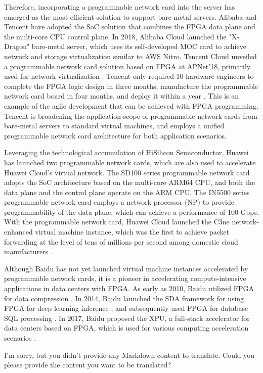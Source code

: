 Therefore, incorporating a programmable network card into the server has emerged as the most efficient solution to support bare-metal servers. Alibaba and Tencent have adopted the SoC solution that combines the FPGA data plane and the multi-core CPU control plane. In 2018, Alibaba Cloud launched the "X-Dragon" bare-metal server, which uses its self-developed MOC card \cite{alicloud-smartnic,alicloud-xdragon} to achieve network and storage virtualization similar to AWS Nitro. Tencent Cloud unveiled a programmable network card solution based on FPGA at APNet’18, primarily used for network virtualization \cite{tencent-smartnic}. Tencent only required 10 hardware engineers to complete the FPGA logic design in three months, manufacture the programmable network card board in four months, and deploy it within a year \cite{tencent-smartnic}. This is an example of the agile development that can be achieved with FPGA programming. Tencent is broadening the application scope of programmable network cards from bare-metal servers to standard virtual machines, and employs a unified programmable network card architecture for both application scenarios.

Leveraging the technological accumulation of HiSilicon Semiconductor, Huawei has launched two programmable network cards, which are also used to accelerate Huawei Cloud's virtual network. The SD100 series programmable network card \cite{sd100} adopts the SoC architecture based on the multi-core ARM64 CPU, and both the data plane and the control plane operate on the ARM CPU. The IN5500 series programmable network card \cite{in200} employs a network processor (NP) to provide programmability of the data plane, which can achieve a performance of 100 Gbps. With the programmable network card, Huawei Cloud launched the C3ne network-enhanced virtual machine instance, which was the first to achieve packet forwarding at the level of tens of millions per second among domestic cloud manufacturers \cite{huawei-smartnic}.

Although Baidu has not yet launched virtual machine instances accelerated by programmable network cards, it is a pioneer in accelerating compute-intensive applications in data centers with FPGA. As early as 2010, Baidu utilized FPGA for data compression \cite{ouyang2010fpga}. In 2014, Baidu launched the SDA framework for using FPGA for deep learning inference \cite{ouyang2014sda}, and subsequently used FPGA for database SQL processing \cite{baidu-fpga-sql}. In 2017, Baidu proposed the XPU, a full-stack accelerator for data centers based on FPGA, which is used for various computing acceleration scenarios \cite{ouyang2017xpu}.

I'm sorry, but you didn't provide any Markdown content to translate. Could you please provide the content you want to be translated?
